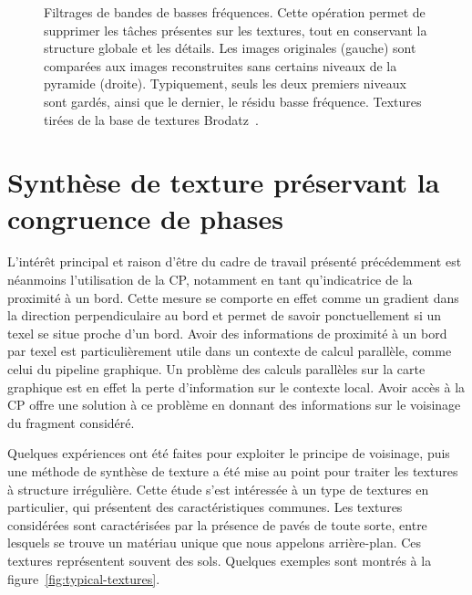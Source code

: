 \begin{figure}
    \caption[Filtrage de bandes de basses fréquences]{Filtrages de bandes de basses fréquences. Cette opération permet de supprimer les tâches présentes sur les textures, tout en conservant la structure globale et les détails. Les images originales (gauche) sont comparées aux images reconstruites sans certains niveaux de la pyramide (droite). Typiquement, seuls les deux premiers niveaux sont gardés, ainsi que le dernier, le résidu basse fréquence. Textures tirées de la base de textures Brodatz~\cite{abdelmounaime_new_2013}.}
    \label{fig:filter-low-freq}
\end{figure}

\section{Synthèse de texture préservant la congruence de phases}

L'intérêt principal et raison d'être du cadre de travail présenté précédemment est néanmoins l'utilisation de la CP, notamment en tant qu'indicatrice de la proximité à un bord. Cette mesure se comporte en effet comme un gradient dans la direction perpendiculaire au bord et permet de savoir ponctuellement si un texel se situe proche d'un bord. Avoir des informations de proximité à un bord par texel est particulièrement utile dans un contexte de calcul parallèle, comme celui du pipeline graphique. Un problème des calculs parallèles sur la carte graphique est en effet la perte d'information sur le contexte local. Avoir accès à la CP offre une solution à ce problème en donnant des informations sur le voisinage du fragment considéré.

\bigskip

Quelques expériences ont été faites pour exploiter le principe de voisinage, puis une méthode de synthèse de texture a été mise au point pour traiter les textures à structure irrégulière. Cette étude s'est intéressée à un type de textures en particulier, qui présentent des caractéristiques communes. Les textures considérées sont caractérisées par la présence de pavés de toute sorte, entre lesquels se trouve un matériau unique que nous appelons arrière-plan. Ces textures représentent souvent des sols. Quelques exemples sont montrés à la figure~\ref{fig:typical-textures}.

\bigskip

